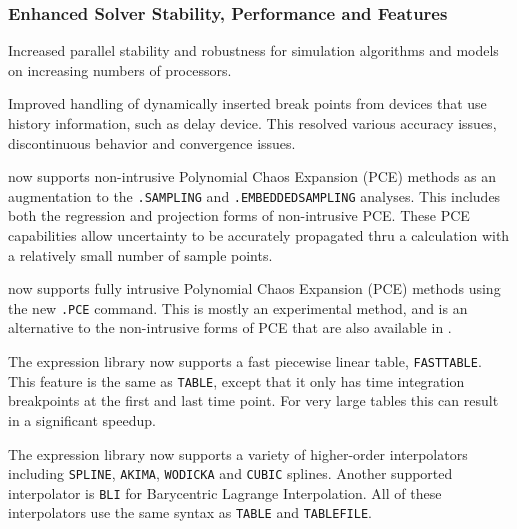 \documentclass[letterpaper]{scrartcl}
\begin{document}
\subsubsection*{Enhanced Solver Stability, Performance and Features}
\begin{XyceItemize}
  \item Increased parallel stability and robustness for simulation
    algorithms and models on increasing numbers of processors.
  \item Improved handling of dynamically inserted break points from
    devices that use history information, such as delay device. This
    resolved various accuracy issues, discontinuous behavior and
    convergence issues.
  \item \Xyce{} now supports non-intrusive Polynomial Chaos Expansion
    (PCE) methods as an augmentation to the \texttt{.SAMPLING} and
    \texttt{.EMBEDDEDSAMPLING} analyses.  This includes both the
    regression and projection forms of non-intrusive PCE. These PCE
    capabilities allow uncertainty to be accurately propagated thru a
    \Xyce{} calculation with a relatively small number of sample
    points.
  \item \Xyce{} now supports fully intrusive Polynomial Chaos
    Expansion (PCE) methods using the new \texttt{.PCE} command.  This
    is mostly an experimental method, and is an alternative to the
    non-intrusive forms of PCE that are also available in \Xyce{}.
  \item The \Xyce{} expression library now supports a fast piecewise
    linear table, \texttt{FASTTABLE}.  This feature is the same as
    \texttt{TABLE}, except that it only has time integration
    breakpoints at the first and last time point.  For very large
    tables this can result in a significant speedup.
  \item The \Xyce{} expression library now supports a variety of
    higher-order interpolators including \texttt{SPLINE},
    \texttt{AKIMA}, \texttt{WODICKA} and \texttt{CUBIC} splines.
    Another supported interpolator is \texttt{BLI} for Barycentric
    Lagrange Interpolation.  All of these interpolators use the same
    syntax as \texttt{TABLE} and \texttt{TABLEFILE}.
\end{XyceItemize}
\end{document}
